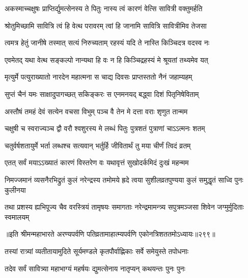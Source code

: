 \begin{center}

\twolineshloka
{अकस्माच्चक्षुषः प्राप्तिर्द्युमत्सेनस्य ते पितुः}
{नास्य त्वं कारणं वेत्सि सावित्री वक्तुमर्हति}

\twolineshloka
{श्रोतुमिच्छामि सावित्रि त्वं हि वेत्थ परावरम्}
{त्वां हि जानामि सावित्रि सावित्रीमिव तेजसा}

\twolineshloka
{त्वमत्र हेतुं जानीषे तस्मात् सत्यं निरुच्यताम्}
{रहस्यं यदि ते नास्ति किञ्चिदत्र वदस्व नः}


\twolineshloka
{एवमेतद् यथा वेत्थ सङ्कल्पो नान्यथा हि वः}
{न हि किञ्चिद्रहस्यं मे श्रूयतां तथ्यमेव यत्}

\twolineshloka
{मृत्युर्मे पत्युराख्यातो नारदेन महात्मना}
{स चाद्य दिवसः प्राप्तस्ततो नैनं जहाम्यहम्}

\twolineshloka
{सुप्तं चैनं यमः साक्षादुपागच्छत् सकिङ्करः}
{स एनमनयद् बद्ध्वा दिशं पितृनिषेविताम्}

\twolineshloka
{अस्तौषं तमहं देवं सत्येन वचसा विभुम्}
{पञ्च वै तेन मे दत्ता वराः शृणुत तान्मम}

\twolineshloka
{चक्षुषी च स्वराज्यञ्च द्वौ वरौ श्वशुरस्य मे}
{लब्धं पितुः पुत्रशतं पुत्राणां चाऽऽत्मनः शतम्}

\twolineshloka
{चतुर्वर्षशतायुर्मे भर्ता लब्धश्च सत्यवान्}
{भर्तुर्हि जीवितार्थं तु मया चीर्णं त्विदं व्रतम्}

\twolineshloka
{एतत् सर्वं मयाऽऽख्यातं कारणं विस्तरेण वः}
{यथावृत्तं सुखोदर्कमिदं दुःखं महन्मम}


\fourlineindentedshloka
{निमज्जमानं व्यसनैरभिद्रुतं}
{कुलं नरेन्द्रस्य तमोमये ह्रदे}
{त्वया सुशीलव्रतपुण्यया कुलं}
{समुद्धृतं साध्वि पुनः कुलीनया}


\fourlineindentedshloka
{तथा प्रशस्य ह्यभिपूज्य चैव}
{वरस्त्रियं तामृषयः समागताः}
{नरेन्द्रमामन्त्र्य सपुत्रमञ्जसा}
{शिवेन जग्मुर्मुदिताः स्वमालयम्}

॥इति श्रीमन्महाभारते अरण्यपर्वणि पतिव्रतामाहात्म्यपर्वणि एकोनत्रिशततमोऽध्यायः॥२९९॥

\resetShloka


\twolineshloka
{तस्यां रात्र्यां व्यतीतायामुदिते सूर्यमण्डले}
{कृतपौर्वाह्णिकाः सर्वे समेयुस्ते तपोधनाः}

\twolineshloka
{तदेव सर्वं सावित्र्या महाभाग्यं महर्षयः}
{द्युमत्सेनाय नातृप्यन् कथयन्तः पुनः पुनः}


\end{center}
